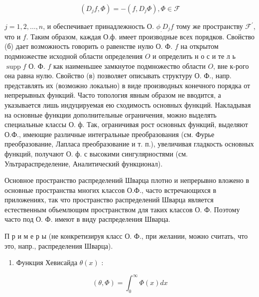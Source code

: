 \documentclass[10pt]{article}
\begin{document}
\[

\left(D_{j} f, \Phi\right)=-\left(f, D_{j} \Phi\right), \Phi \in \mathscr{F}

\]



$j=1,2, \ldots, n$, и обеспечивает принадлежность О. $\phi_{.} D_{j} f$ тому же пространству $\mathscr{F}^{\prime}$, что и $f$. Таким образом, каждая О.ф. имеет производные всех порядков. Свойство (б) дает возможность говорить о равенстве нулю О. Ф. $f$ на открытом подмножестве исходной области определения $O$ и определить н о с и те л ь $\operatorname{supp} f$ О. Ф. $f$ как наименьшее замкнутое подмножество области $O$, вне к-рого она равна нулю. Свойство (в) позволяет описывать структуру О. Ф., напр. представлять их (возможно локально) в виде производных конечного порядка от непрерывных функций. Часто топология явным образом не вводится, а указывается лишь индуцируемая ею сходимость основных функций. Накладывая на основные функции дополнительные ограничения, можно выделять специальные классы О. ф. Так, ограничивая рост основных функций, выделяют О.Ф., имеющие различные интегральные преобразования (см. Фурье преобразование, Лапласа преобразование и т. п.), увеличивая гладкость основных функций, получают О. ф. с высокими сингулярностями (см. Ультрараспределение, Аналитический функционал).



Основное пространство распределений Шварца плотно и непрерывно вложено в основные пространства многих классов О.Ф., часто встречающихся в приложениях, так что пространство распределений Шварца является естественным объемлющим пространством для таких классов О. Ф. Поэтому часто под О. Ф. имеют в виду распределения Шварца.



П р и м е р ы (не конкретизируя класс О. Ф., при желании, можно считать, что это, напр., распределения Шварца).



\begin{enumerate}

  \item Функция Хевисайда $\theta(x)$ :

\end{enumerate}



\[

(\theta, \Phi)=\int_{0}^{\infty} \Phi(x) d x

\]
\end{document}
